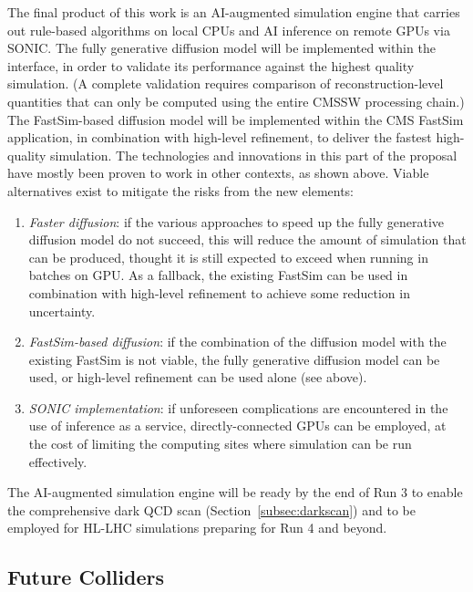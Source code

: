 The final product of this work is an AI-augmented simulation engine
that carries out rule-based algorithms on local CPUs and AI inference on remote GPUs via SONIC.
The fully generative diffusion model will be implemented within the \GEANTfour interface, in order to validate its performance against the highest quality simulation.
(A complete validation requires comparison of reconstruction-level quantities that can only be computed using the entire CMSSW processing chain.)
The FastSim-based diffusion model will be implemented within the CMS FastSim application, in combination with high-level refinement, to deliver the fastest high-quality simulation.
The technologies and innovations in this part of the proposal have mostly been proven to work in other contexts, as shown above.
Viable alternatives exist to mitigate the risks from the new elements:
\begin{enumerate}
\item \textit{Faster diffusion}: if the various approaches to speed up the fully generative diffusion model do not succeed, this will reduce the amount of simulation that can be produced, thought it is still expected to exceed \GEANTfour when running in batches on GPU. As a fallback, the existing FastSim can be used in combination with high-level refinement to achieve some reduction in uncertainty.
\item \textit{FastSim-based diffusion}: if the combination of the diffusion model with the existing FastSim is not viable, the fully generative diffusion model can be used, or high-level refinement can be used alone (see above).
\item \textit{SONIC implementation}: if unforeseen complications are encountered in the use of inference as a service, directly-connected GPUs can be employed, at the cost of limiting the computing sites where simulation can be run effectively.
\end{enumerate}
The AI-augmented simulation engine will be ready by the end of Run 3 to enable the comprehensive dark QCD scan (Section~\ref{subsec:darkscan})
and to be employed for HL-LHC simulations preparing for Run 4 and beyond.

\subsection{Future Colliders}\label{subsec:mucoll}


